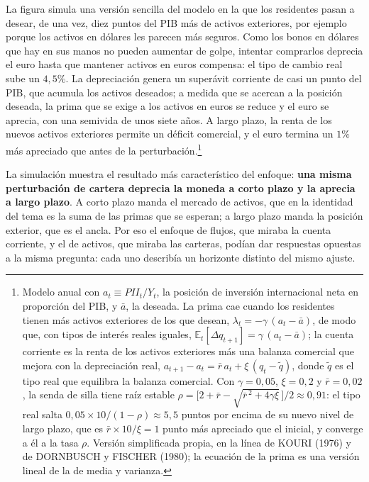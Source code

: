 \documentclass[10pt,a4paper]{article}
\begin{document}
La figura simula una versión sencilla del modelo en la que los residentes pasan a desear, de una vez, diez puntos del PIB más de activos exteriores, por ejemplo porque los activos en dólares les parecen más seguros. Como los bonos en dólares que hay en sus manos no pueden aumentar de golpe, intentar comprarlos deprecia el euro hasta que mantener activos en euros compensa: el tipo de cambio real sube un $4{,}5\%$. La depreciación genera un superávit corriente de casi un punto del PIB, que acumula los activos deseados; a medida que se acercan a la posición deseada, la prima que se exige a los activos en euros se reduce y el euro se aprecia, con una semivida de unos siete años. A largo plazo, la renta de los nuevos activos exteriores permite un déficit comercial, y el euro termina un $1\%$ más apreciado que antes de la perturbación.\footnote{%
    Modelo anual con $a_t\equiv PII_t/Y_t$, la posición de inversión internacional neta en proporción del PIB, y $\bar a$, la deseada. La prima cae cuando los residentes tienen más activos exteriores de los que desean, $\lambda_t=-\gamma\,(a_t-\bar a)$, de modo que, con tipos de interés reales iguales, $\mathbb{E}_t[\Delta q_{t+1}]=\gamma\,(a_t-\bar a)$; la cuenta corriente es la renta de los activos exteriores más una balanza comercial que mejora con la depreciación real, $a_{t+1}-a_t=\bar r\,a_t+\xi\,(q_t-\tilde q)$, donde $\tilde q$ es el tipo real que equilibra la balanza comercial. Con $\gamma=0{,}05$, $\xi=0{,}2$ y $\bar r=0{,}02$, la senda de silla tiene raíz estable $\rho=\big[2+\bar r-\sqrt{\bar r^{\,2}+4\gamma\xi}\,\big]/2\approx0{,}91$: el tipo real salta $0{,}05\times10/(1-\rho)\approx5{,}5$ puntos por encima de su nuevo nivel de largo plazo, que es $\bar r\times10/\xi=1$ punto más apreciado que el inicial, y converge a él a la tasa $\rho$. Versión simplificada propia, en la línea de KOURI (1976) y de DORNBUSCH y FISCHER (1980); la ecuación de la prima es una versión lineal de la de media y varianza.
}

La simulación muestra el resultado más característico del enfoque: \textbf{una misma perturbación de cartera deprecia la moneda a corto plazo y la aprecia a largo plazo}. A corto plazo manda el mercado de activos, que en la identidad del tema es la suma de las primas que se esperan; a largo plazo manda la posición exterior, que es el ancla. Por eso el enfoque de flujos, que miraba la cuenta corriente, y el de activos, que miraba las carteras, podían dar respuestas opuestas a la misma pregunta: cada uno describía un horizonte distinto del mismo ajuste.
\end{document}
